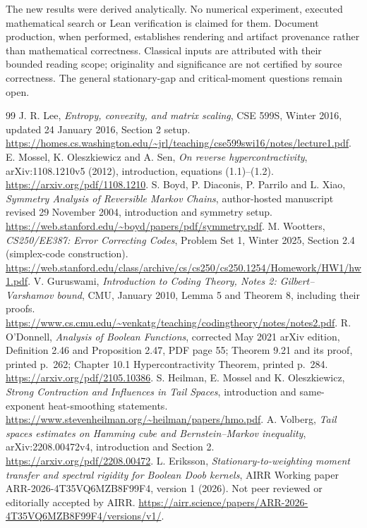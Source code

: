 \documentclass[11pt]{article}
\begin{document}
The new results were derived analytically. No numerical experiment, executed mathematical search or Lean verification is claimed for them. Document production, when performed, establishes rendering and artifact provenance rather than mathematical correctness. Classical inputs are attributed with their bounded reading scope; originality and significance are not certified by source correctness. The general stationary-gap and critical-moment questions remain open.
\begin{thebibliography}{99}
 J. R. Lee, \emph{Entropy, convexity, and matrix scaling}, CSE 599S, Winter 2016, updated 24 January 2016, Section 2 setup. \url{https://homes.cs.washington.edu/~jrl/teaching/cse599swi16/notes/lecture1.pdf}.
 E. Mossel, K. Oleszkiewicz and A. Sen, \emph{On reverse hypercontractivity}, arXiv:1108.1210v5 (2012), introduction, equations (1.1)--(1.2). \url{https://arxiv.org/pdf/1108.1210}.
 S. Boyd, P. Diaconis, P. Parrilo and L. Xiao, \emph{Symmetry Analysis of Reversible Markov Chains}, author-hosted manuscript revised 29 November 2004, introduction and symmetry setup. \url{https://web.stanford.edu/~boyd/papers/pdf/symmetry.pdf}.
 M. Wootters, \emph{CS250/EE387: Error Correcting Codes}, Problem Set 1, Winter 2025, Section 2.4 (simplex-code construction). \url{https://web.stanford.edu/class/archive/cs/cs250/cs250.1254/Homework/HW1/hw1.pdf}.
 V. Guruswami, \emph{Introduction to Coding Theory, Notes 2: Gilbert--Varshamov bound}, CMU, January 2010, Lemma 5 and Theorem 8, including their proofs. \url{https://www.cs.cmu.edu/~venkatg/teaching/codingtheory/notes/notes2.pdf}.
 R. O'Donnell, \emph{Analysis of Boolean Functions}, corrected May 2021 arXiv edition, Definition 2.46 and Proposition 2.47, PDF page 55; Theorem 9.21 and its proof, printed p.~262; Chapter 10.1 Hypercontractivity Theorem, printed p.~284. \url{https://arxiv.org/pdf/2105.10386}.
 S. Heilman, E. Mossel and K. Oleszkiewicz, \emph{Strong Contraction and Influences in Tail Spaces}, introduction and same-exponent heat-smoothing statements. \url{https://www.stevenheilman.org/~heilman/papers/hmo.pdf}.
 A. Volberg, \emph{Tail spaces estimates on Hamming cube and Bernstein--Markov inequality}, arXiv:2208.00472v4, introduction and Section 2. \url{https://arxiv.org/pdf/2208.00472}.
 L. Eriksson, \emph{Stationary-to-weighting moment transfer and spectral rigidity for Boolean Doob kernels}, AIRR Working paper ARR-2026-4T35VQ6MZB8F99F4, version 1 (2026). Not peer reviewed or editorially accepted by AIRR. \url{https://airr.science/papers/ARR-2026-4T35VQ6MZB8F99F4/versions/v1/}.

\end{thebibliography}
\end{document}
